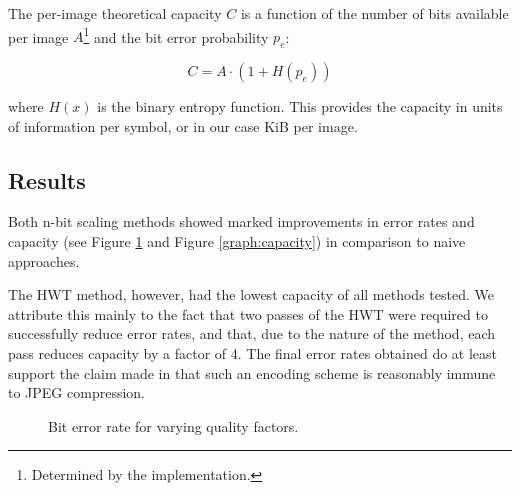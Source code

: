 The per-image theoretical capacity $C$ is a function of the number of bits available per image $A$\footnote{Determined by the implementation.} and the bit error probability $p_e$:

\begin{equation}
    C = A \cdot (1 + H(p_e))
\end{equation}

where $H(x)$ is the binary entropy function. This provides the capacity in units of information per symbol, or in our case KiB per image.

\subsection{Results}

Both n-bit scaling methods showed marked improvements in error rates and capacity (see Figure \ref{graph:ber} and Figure \ref{graph:capacity}) in comparison to naive approaches.

The HWT method, however, had the lowest capacity of all methods tested. We attribute this mainly to the fact that two passes of the HWT were required to successfully reduce error rates, and that, due to the nature of the method, each pass reduces capacity by a factor of 4. The final error rates obtained do at least support the claim made in \cite{haar} that such an encoding scheme is reasonably immune to JPEG compression.


\begin{figure}[tbph]
  \begin{center}
    \caption{Bit error rate for varying quality factors.}
    \label{graph:ber}
  \end{center}
\end{figure}

